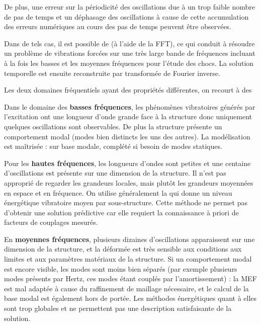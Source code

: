 \medskip
{}
De plus, une erreur sur la périodicité des oscillations due à un trop faible nombre de pas de temps et
un déphasage des oscillations à cause de cette accumulation des erreurs numériques au cours des pas
de temps peuvent être observées.

Dans de tels cas, il est possible de 
(à l'aide de la FFT),  ce qui conduit à résoudre un problème de vibrations forcées sur une très large bande
de fréquences incluant à la fois les basses et les moyennes fréquences pour l'étude des chocs.
La solution temporelle est ensuite reconstruite par transformée de Fourier
inverse.

Les deux domaines fréquentiels ayant des propriétés différentes, on recourt à des 

\medskip
Dans le domaine des \textbf{basses fréquences}, les phénomènes vibratoires générés par l'excitation ont une longueur
d'onde grande face à la structure donc uniquement quelques oscillations sont observables. De plus
la structure présente un comportement modal (modes bien distincts les uns des autres).
La modélisation est maîtrisée :  sur base modale, complété si besoin de modes
statiques.

\medskip
Pour les \textbf{hautes fréquences}, les longueurs d'ondes sont petites et une centaine d'oscillations est présente sur une
dimension de la structure. Il n'est pas approprié de regarder les grandeurs locales, mais plutôt les
grandeurs moyennées en espace et en fréquence. On utilise généralement la  
qui donne un niveau énergétique vibratoire moyen par sous-structure. Cette méthode ne permet
pas d'obtenir une solution prédictive car elle requiert la connaissance à priori de facteurs de
couplages mesurés.

\medskip
En \textbf{moyennes fréquences}, plusieurs dizaines d'oscillations apparaissent sur une dimension de la structure, et la
déformée est très sensible aux conditions aux limites et aux paramètres matériaux
de la structure. Si un comportement modal est encore visible, les modes sont moins bien
séparés (par exemple plusieurs modes présents par Hertz, ces modes étant couplés
par l'amortissement) : la MEF est mal adaptée à cause du raffinement de maillage
nécessaire, et le calcul de la base modal est également hors de portée. Les méthodes
énergétiques quant à elles sont trop globales et ne permettent pas une description satisfaisante
de la solution.

